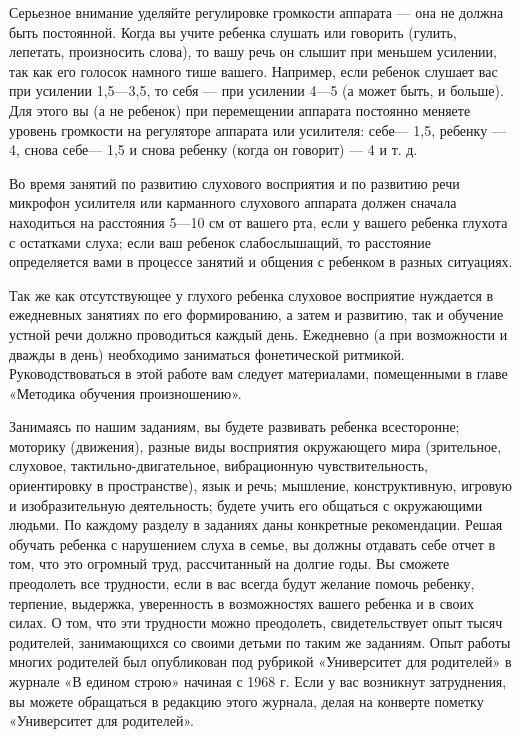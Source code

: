 \documentclass{book}
\begin{document}
Серьезное внимание уделяйте регулировке громкости аппарата --- она не
должна быть постоянной. Когда вы учите ребенка слушать или говорить
(гулить, лепетать, произносить слова), то вашу речь он слышит при
меньшем усилении, так как его голосок намного тише вашего. Например,
если ребенок слушает вас при усилении 1,5---3,5, то себя --- при
усилении 4---5 (а может быть, и больше). Для этого вы (а не ребенок) при
перемещении аппарата постоянно меняете уровень громкости на регуляторе
аппарата или усилителя: себе--- 1,5, ребенку --- 4, снова себе--- 1,5 и
снова ребенку (когда он говорит) --- 4 и т. д.

Во время занятий по развитию слухового восприятия и по развитию речи
микрофон усилителя или карманного слухового аппарата должен сначала
находиться на расстояния 5---10 см от вашего рта, если у вашего ребенка
глухота с остатками слуха; если ваш ребенок слабослышащий, то расстояние
определяется вами в процессе занятий и общения с ребенком в разных
ситуациях.

Так же как отсутствующее у глухого ребенка слуховое восприятие нуждается
в ежедневных занятиях по его формированию, а затем и развитию, так и
обучение устной речи должно проводиться каждый день. Ежедневно (а при
возможности и дважды в день) необходимо заниматься фонетической
ритмикой. Руководствоваться в этой работе вам следует материалами,
помещенными в главе «Методика обучения произношению».

Занимаясь по нашим заданиям, вы будете развивать ребенка всесторонне;
моторику (движения), разные виды восприятия окружающего мира
(зрительное, слуховое, тактильно-двигательное, вибрационную
чувствительность, ориентировку в пространстве), язык и речь; мышление,
конструктивную, игровую и изобразительную деятельность; будете учить его
общаться с окружающими людьми. По каждому разделу в заданиях даны
конкретные рекомендации. Решая обучать ребенка с нарушением слуха в
семье, вы должны отдавать себе отчет в том, что это огромный труд,
рассчитанный на долгие годы. Вы сможете преодолеть все трудности, если в
вас всегда будут желание помочь ребенку, терпение, выдержка, уверенность
в возможностях вашего ребенка и в своих силах. О том, что эти трудности
можно преодолеть, свидетельствует опыт тысяч родителей, занимающихся со
своими детьми по таким же заданиям. Опыт работы многих родителей был
опубликован под рубрикой «Университет для родителей» в журнале «В едином
строю» начиная с 1968 г. Если у вас возникнут затруднения, вы можете
обращаться в редакцию этого журнала, делая на конверте пометку
«Университет для родителей».
\end{document}
